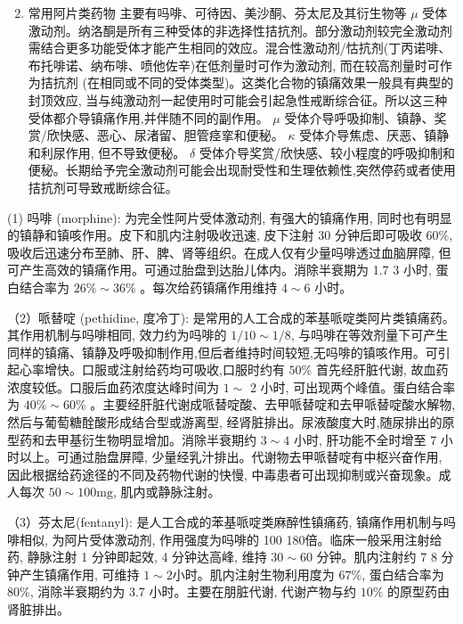 \documentclass[10pt]{article}
\begin{document}
\begin{enumerate}
  \setcounter{enumi}{1}
  \item 常用阿片类药物 主要有吗啡、可待因、美沙酮、芬太尼及其衍生物等 $\mu$ 受体激动剂。纳洛酮是所有三种受体的非选择性拮抗剂。部分激动剂较完全激动剂需结合更多功能受体才能产生相同的效应。混合性激动剂/怙抗剂(丁丙诺啡、布托啡诺、纳布啡、喷他佐辛)在低剂量时可作为激动剂, 而在较高剂量时可作为拮抗剂 (在相同或不同的受体类型)。这类化合物的镇痛效果一般具有典型的封顶效应, 当与纯激动剂一起使用时可能会引起急性戒断综合征。所以这三种受体都介导镇痛作用,并伴随不同的副作用。 $\mu$ 受体介导呼吸抑制、镇静、奖赏/欣快感、恶心、尿渚留、胆管痉挛和便秘。 $\kappa$ 受体介导焦虑、厌恶、镇静和利尿作用, 但不导致便秘。 $\delta$ 受体介导奖赏/欣快感、较小程度的呼吸抑制和便秘。长期给予完全激动剂可能会出现耐受性和生理依赖性,突然停药或者使用拮抗剂可导致戒断综合征。
\end{enumerate}

(1) 吗啡 (morphine): 为完全性阿片受体激动剂, 有强大的镇痛作用, 同时也有明显的镇静和镇咳作用。皮下和肌内注射吸收迅速, 皮下注射 30 分钟后即可吸收 $60 \%$, 吸收后迅速分布至肺、肝、脾、肾等组织。在成人仅有少量吗啡透过血脑屏障, 但可产生高效的镇痛作用。可通过胎盘到达胎儿体内。消除半衰期为 1.7 3 小时, 蛋白结合率为 $26 \% \sim 36 \%$ 。每次给药镇痛作用维持 $4 \sim 6$ 小时。

（2）哌替啶 (pethidine, 度冷丁): 是常用的人工合成的苯基哌啶类阿片类镇痛药。其作用机制与吗啡相同, 效力约为吗啡的 $1 / 10 \sim 1 / 8$, 与吗啡在等效剂量下可产生同样的镇痛、镇静及呼吸抑制作用,但后者维持时间较短,无吗啡的镇咳作用。可引起心率增快。口服或注射给药均可吸收,口服时约有 $50 \%$ 首先经肝脏代谢, 故血药浓度较低。口服后血药浓度达峰时间为 $1 \sim$ 2 小时, 可出现两个峰值。蛋白结合率为 $40 \% \sim 60 \%$ 。主要经肝脏代谢成哌替啶酸、去甲哌替啶和去甲哌替啶酸水解物, 然后与葡萄糖酫酸形成结合型或游离型, 经肾脏排出。尿液酸度大时,随尿排出的原型药和去甲基衍生物明显增加。消除半衰期约 $3 \sim 4$ 小时, 肝功能不全时增至 7 小时以上。可通过胎盘屏障, 少量经乳汁排出。代谢物去甲哌替啶有中枢兴奋作用, 因此根据给药途径的不同及药物代谢的快慢, 中毒患者可出现抑制或兴奋现象。成人每次 $50 \sim 100 \mathrm{mg}$, 肌内或静脉注射。

（3）芬太尼(fentanyl): 是人工合成的苯基哌啶类麻醉性镇痛药, 镇痛作用机制与吗啡相似, 为阿片受体激动剂, 作用强度为吗啡的 100 180倍。临床一般采用注射给药, 静脉注射 1 分钟即起效, 4 分钟达高峰, 维持 $30 \sim 60$ 分钟。肌内注射约 7 8 分钟产生镇痛作用, 可维持 $1 \sim 2$小时。肌内注射生物利用度为 $67 \%$, 蛋白结合率为 $80 \%$, 消除半衰期约为 3.7 小时。主要在朋脏代谢, 代谢产物与约 $10 \%$ 的原型药由肾脏排出。
\end{document}
